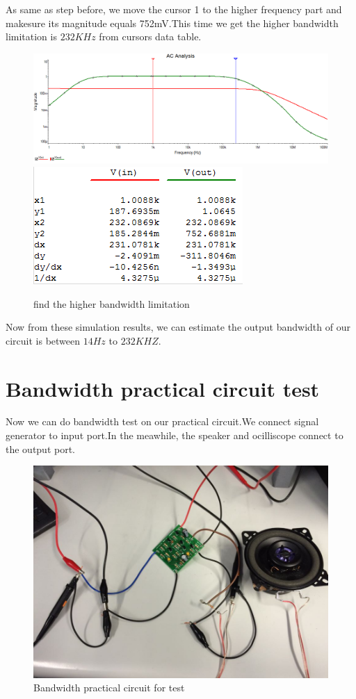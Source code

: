 As same as step before, we move the cursor 1 to the higher frequency part and makesure its magnitude equals 752mV.This time we get the higher bandwidth limitation is $232KHz$ from cursors data table.
\begin{figure}[htbp]
\centering
\includegraphics[scale=0.45]{"../Photo/Chap7/higher band"}\\[0.5cm]
\includegraphics[scale=1]{"../Photo/Chap7/higher bandwoth data"}
\caption{find the higher bandwidth limitation}
\label{fig:find the higher bandwidth limitation}
\end{figure}

Now from these simulation results, we can estimate the output bandwidth of our circuit is between $14Hz$ to $232KHZ$.

\section{Bandwidth practical circuit test}
Now we can do bandwidth test on our practical circuit.We connect signal generator to input port.In the meawhile, the speaker and ocilliscope connect to the output port.
\begin{figure}[htbp]
\centering
\includegraphics[scale=0.6]{"../Photo/Chap7/practical circuit"}
\caption{Bandwidth practical circuit for test}
\label{fig:Bandwidth practical circuit for test}
\end{figure}

